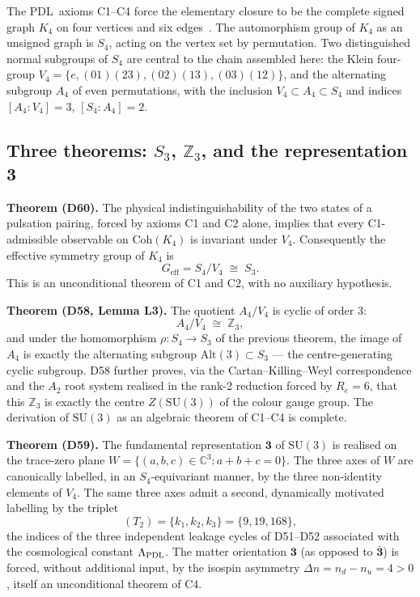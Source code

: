 \documentclass[11pt,a4paper]{article}
\theoremstyle{plain}
\theoremstyle{definition}
\theoremstyle{remark}
\newcommand{\PDL}{\textnormal{PDL}}
\newcommand{\Kfour}{K_4}
\newcommand{\Sfour}{S_4}
\newcommand{\Sthree}{S_3}
\newcommand{\Afour}{A_4}
\newcommand{\Vfour}{V_4}
\newcommand{\Zthree}{\mathbb{Z}_3}
\newcommand{\SUthree}{\mathrm{SU}(3)}
\renewcommand{\Re}{R_e}
\newcommand{\nuu}{n_u}
\newcommand{\ndd}{n_d}
\newcommand{\Dn}{\Delta n}
\newcommand{\kone}{k_1}
\newcommand{\ktwo}{k_2}
\newcommand{\kthree}{k_3}
\begin{document}
The \PDL\ axioms C1--C4 force the elementary closure to be the complete signed graph $\Kfour$ on four vertices and six edges~\cite{D47}. The automorphism group of $\Kfour$ as an unsigned graph is $\Sfour$, acting on the vertex set by permutation. Two distinguished normal subgroups of $\Sfour$ are central to the chain assembled here: the Klein four-group $\Vfour = \{e, (01)(23), (02)(13), (03)(12)\}$, and the alternating subgroup $\Afour$ of even permutations, with the inclusion $\Vfour \subset \Afour \subset \Sfour$ and indices $[\Afour:\Vfour] = 3$, $[\Sfour:\Afour] = 2$.

\subsection{Three theorems: \texorpdfstring{$\Sthree$}{S3}, \texorpdfstring{$\Zthree$}{Z3}, and the representation \texorpdfstring{$\mathbf{3}$}{3}}

\begin{pdlbox}
\textbf{Theorem (D60).} The physical indistinguishability of the two states of a pulsation pairing, forced by axioms C1 and C2 alone, implies that every C1-admissible observable on $\mathrm{Coh}(\Kfour)$ is invariant under $\Vfour$. Consequently the effective symmetry group of $\Kfour$ is
\[
G_{\mathrm{eff}} = \Sfour/\Vfour \;\cong\; \Sthree.
\]
This is an unconditional theorem of C1 and C2, with no auxiliary hypothesis.
\end{pdlbox}

\begin{pdlbox}
\textbf{Theorem (D58, Lemma L3).} The quotient $\Afour/\Vfour$ is cyclic of order 3:
\[
\Afour/\Vfour \;\cong\; \Zthree,
\]
and under the homomorphism $\rho \colon \Sfour \to \Sthree$ of the previous theorem, the image of $\Afour$ is exactly the alternating subgroup $\mathrm{Alt}(3) \subset \Sthree$ --- the centre-generating cyclic subgroup. D58 further proves, via the Cartan--Killing--Weyl correspondence and the $A_2$ root system realised in the rank-2 reduction forced by $\Re = 6$, that this $\Zthree$ is exactly the centre $Z(\SUthree)$ of the colour gauge group. The derivation of $\SUthree$ as an algebraic theorem of C1--C4 is complete.
\end{pdlbox}

\begin{pdlbox}
\textbf{Theorem (D59).} The fundamental representation $\mathbf{3}$ of $\SUthree$ is realised on the trace-zero plane $W = \{(a,b,c) \in \mathbb{C}^3 : a+b+c = 0\}$. The three axes of $W$ are canonically labelled, in an $\Sfour$-equivariant manner, by the three non-identity elements of $\Vfour$. The same three axes admit a second, dynamically motivated labelling by the triplet
\[
(T_2) = \{\kone, \ktwo, \kthree\} = \{9, 19, 168\},
\]
the indices of the three independent leakage cycles of D51--D52 associated with the cosmological constant $\Lambda_{\PDL}$. The matter orientation $\mathbf{3}$ (as opposed to $\bar{\mathbf{3}}$) is forced, without additional input, by the isospin asymmetry $\Dn = \ndd - \nuu = 4 > 0$, itself an unconditional theorem of C4.
\end{pdlbox}
\end{document}
